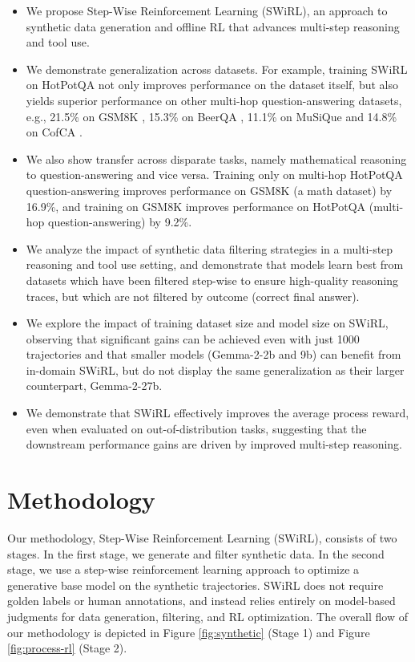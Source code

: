 \documentclass{article} %
\begin{document}
\begin{itemize}
    \item We propose Step-Wise Reinforcement Learning (SWiRL), an approach to synthetic data generation and offline RL that advances multi-step reasoning and tool use. 
    \item  We demonstrate generalization across datasets. For example, training SWiRL on HotPotQA not only improves performance on the dataset itself, but also yields superior performance on other multi-hop question-answering datasets, e.g., 21.5\% on GSM8K \citep{gsm8k2021}, 15.3\% on BeerQA \citep{qi2021beerqa}, 11.1\% on MuSiQue \citep{trivedi2022musiquemultihopquestionssinglehop} and 14.8\% on CofCA \citep{wu2024cofcastepwisecounterfactualmultihop}.
    \item We also show transfer across disparate tasks, namely mathematical reasoning to question-answering and vice versa. Training only on multi-hop HotPotQA question-answering improves performance on GSM8K \citep{gsm8k2021} (a math dataset) by 16.9\%, and training on GSM8K improves performance on HotPotQA (multi-hop question-answering) by 9.2\%.
    \item We analyze the impact of synthetic data filtering strategies in a multi-step reasoning and tool use setting, and demonstrate that models learn best from datasets which have been filtered step-wise to ensure high-quality reasoning traces, but which are not filtered by outcome (correct final answer).
    \item We explore the impact of training dataset size and model size on SWiRL, observing that significant gains can be achieved even with just 1000 trajectories and that smaller models (Gemma-2-2b and 9b) can benefit from in-domain SWiRL, but do not display the same generalization as their larger counterpart, Gemma-2-27b.
    \item We demonstrate that SWiRL effectively improves the average process reward, even when evaluated on out-of-distribution tasks, suggesting that the downstream performance gains are driven by improved multi-step reasoning.
\end{itemize}
 

\section{Methodology}

Our methodology, Step-Wise Reinforcement Learning (SWiRL), consists of two stages. In the first stage, we generate and filter synthetic data. In the second stage, we use a step-wise reinforcement learning approach to optimize a generative base model on the synthetic trajectories. SWiRL does not require golden labels or human annotations, and instead relies entirely on model-based judgments for data generation, filtering, and RL optimization. The overall flow of our methodology is depicted in Figure \ref{fig:synthetic} (Stage 1) and Figure \ref{fig:process-rl} (Stage 2).
\end{document}
